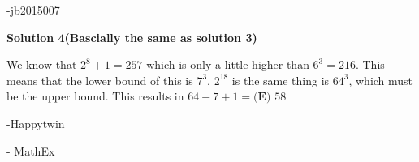 \begin{enumerate}
 -jb2015007

 



\textbf{Solution 4(Bascially the same as solution 3)}

We know that $2^8+1=257$ which is only a little higher than $6^3=216$. This means that the lower bound of this is $7^3$. $2^{18}$ is the same thing is $64^3$, which must be the upper bound. This results in $64-7+1= \boxed{\textbf{(E) }58}$

 -Happytwin

 - MathEx

 


\end{enumerate}